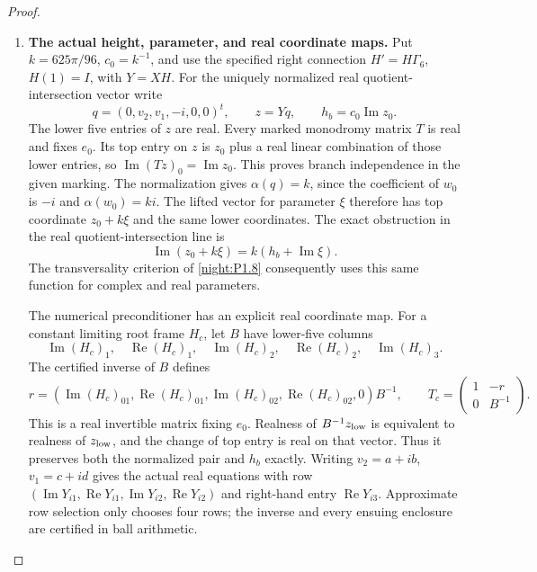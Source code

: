 \begin{proof}
\begin{enumerate}[label=\arabic*.]
\item \textbf{The actual height, parameter, and real coordinate maps.}
Put $k=625\pi/96$, $c_0=k^{-1}$, and use the specified right
connection $H'=H\Gamma_6$, $H(1)=I$, with $Y=XH$.
For the uniquely normalized real quotient-intersection vector write
\[
 q=(0,v_2,v_1,-i,0,0)^t,\qquad z=Yq,
 \qquad h_b=c_0\operatorname{Im}z_0.
\]
The lower five entries of $z$ are real. Every marked monodromy
matrix $T$ is real and fixes $e_0$. Its top entry on $z$ is
$z_0$ plus a real linear combination of those lower entries, so
$\operatorname{Im}(Tz)_0=\operatorname{Im}z_0$. This proves
branch independence in the given marking.
The normalization gives $\alpha(q)=k$, since the coefficient of
$w_0$ is $-i$ and $\alpha(w_0)=ki$. The lifted vector for parameter
$\xi$ therefore has top coordinate $z_0+k\xi$ and the same lower
coordinates. The exact obstruction in the real quotient-intersection
line is
\[
 \operatorname{Im}(z_0+k\xi)=k(h_b+\operatorname{Im}\xi).
\]
The transversality criterion of \cref{night:P1.8} consequently
uses this same function for complex and real parameters.

The numerical preconditioner has an explicit real coordinate map.
For a constant limiting root frame $H_c$, let $B$ have lower-five
columns
\[
 \operatorname{Im}(H_c)_1,\quad\operatorname{Re}(H_c)_1,
 \quad\operatorname{Im}(H_c)_2,\quad\operatorname{Re}(H_c)_2,
 \quad\operatorname{Im}(H_c)_3.
\]
The certified inverse of $B$ defines
\[
 r=(\operatorname{Im}(H_c)_{01},\operatorname{Re}(H_c)_{01},
       \operatorname{Im}(H_c)_{02},\operatorname{Re}(H_c)_{02},0)B^{-1},
 \qquad
 T_c=\begin{pmatrix}1&-r\\0&B^{-1}\end{pmatrix}.
\]
This is a real invertible matrix fixing $e_0$.
Realness of $B^{-1}z_{\rm low}$ is equivalent to realness of
$z_{\rm low}$, and the change of top entry is real on that vector.
Thus it preserves both the normalized pair and $h_b$ exactly.
Writing $v_2=a+ib$, $v_1=c+id$ gives the actual real equations
with row
$(\operatorname{Im}Y_{i1},\operatorname{Re}Y_{i1},
\operatorname{Im}Y_{i2},\operatorname{Re}Y_{i2})$
and right-hand entry $\operatorname{Re}Y_{i3}$.
Approximate row selection only chooses four rows; the inverse
and every ensuing enclosure are certified in ball arithmetic.


\end{enumerate}
\end{proof}
